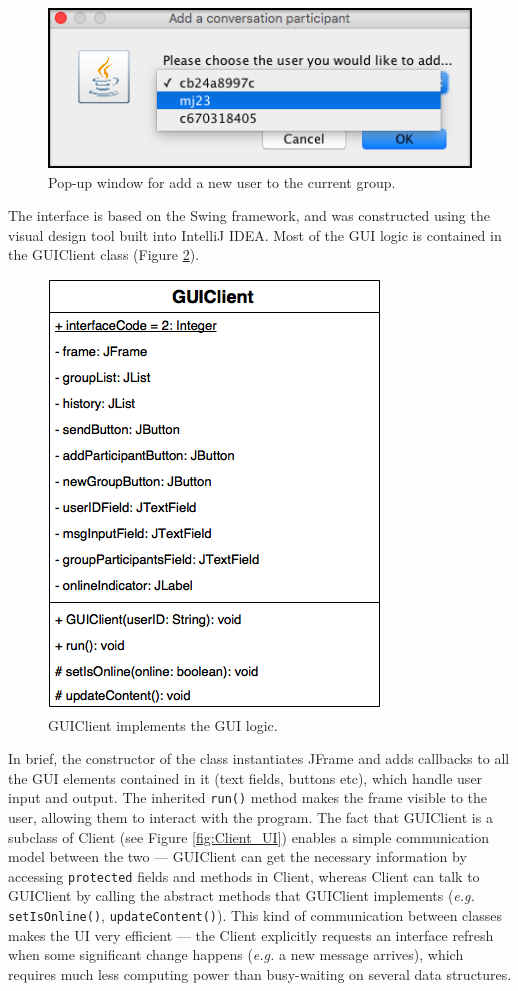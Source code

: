\documentclass[a4paper, 12pt]{report}
\begin{document}
\begin{figure}[H]
    \captionsetup{width=0.84\textwidth}
    \centering
    \includegraphics[width=0.5\linewidth]{pics/GUI_add.png}
    \caption{\label{fig:GUI_add} Pop-up window for add a new user to the current group.}
\end{figure}

The interface is based on the Swing framework, and was constructed using the visual design tool built into IntelliJ IDEA. Most of the GUI logic is contained in the GUIClient class (Figure \ref{fig:GUIClient}).

\begin{figure}[H]
    \captionsetup{width=0.84\textwidth}
    \centering
    \includegraphics[width=0.45\linewidth]{pics/GUIClient.png}
    \caption{\label{fig:GUIClient} GUIClient implements the GUI logic.}
\end{figure}
In brief, the constructor of the class instantiates JFrame and adds callbacks to all the GUI elements contained in  it (text fields, buttons etc), which handle user input and output. The inherited \texttt{run()} method makes the frame visible to the user, allowing them to interact with the program. The fact that GUIClient is a subclass of Client (see Figure \ref{fig:Client_UI}) enables a simple communication model between the two --- GUIClient can get the necessary information by accessing \texttt{protected} fields and methods in Client, whereas Client can talk to GUIClient by calling the abstract methods that GUIClient implements (\textit{e.g.} \texttt{setIsOnline()}, \texttt{updateContent()}). This kind of communication between classes makes the UI very efficient --- the Client explicitly requests an interface refresh when some significant change happens (\textit{e.g.} a new message arrives), which requires much less computing power than busy-waiting on several data structures.
\end{document}
